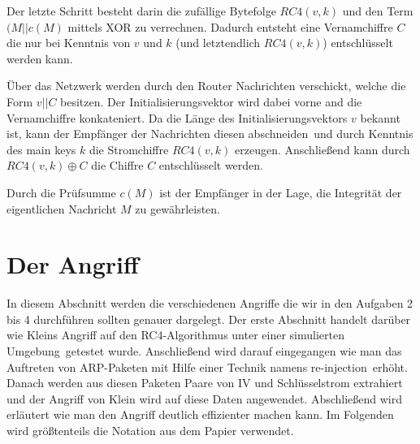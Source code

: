 \documentclass[10pt,a4paper]{article}
\begin{document}
Der letzte Schritt besteht darin die zufällige Bytefolge $RC4(v,k)$ und den Term $(M || c(M)$ mittels XOR zu verrechnen. Dadurch entsteht eine Vernamchiffre $C$ die nur bei Kenntnis von $v$ und $k$ (und letztendlich $RC4(v,k)$) entschlüsselt werden kann.

Über das Netzwerk werden durch den Router Nachrichten verschickt, welche die Form $v || C$ besitzen. Der Initialisierungsvektor wird dabei vorne and die Vernamchiffre konkateniert. Da die Länge des Initialisierungsvektors $v$ bekannt ist, kann der Empfänger der Nachrichten diesen \glqq abschneiden\grqq\ und durch Kenntnis des main keys $k$ die Stromchiffre $RC4(v,k)$ erzeugen. Anschließend kann durch $RC4(v,k) \oplus C$ die Chiffre $C$ entschlüsselt werden.

Durch die Prüfsumme $c(M)$ ist der Empfänger in der Lage, die Integrität der eigentlichen Nachricht $M$ zu gewährleisten. 

\section{Der Angriff}
In diesem Abschnitt werden die verschiedenen Angriffe die wir in den Aufgaben 2 bis 4 durchführen sollten genauer dargelegt. Der erste Abschnitt handelt darüber wie Kleins Angriff auf den RC4-Algorithmus unter einer \glqq simulierten Umgebung\grqq \ getestet wurde. Anschließend wird darauf eingegangen wie man das Auftreten von ARP-Paketen  mit Hilfe einer Technik namens \glqq re-injection\grqq \ erhöht. Danach werden aus diesen Paketen Paare von IV und Schlüsselstrom extrahiert und der Angriff von Klein wird auf diese Daten angewendet. Abschließend wird erläutert wie man den Angriff deutlich effizienter machen kann. Im Folgenden wird größtenteils die Notation aus dem Papier \cite[Kapitel 3.1]{TWP07} verwendet.
\end{document}
